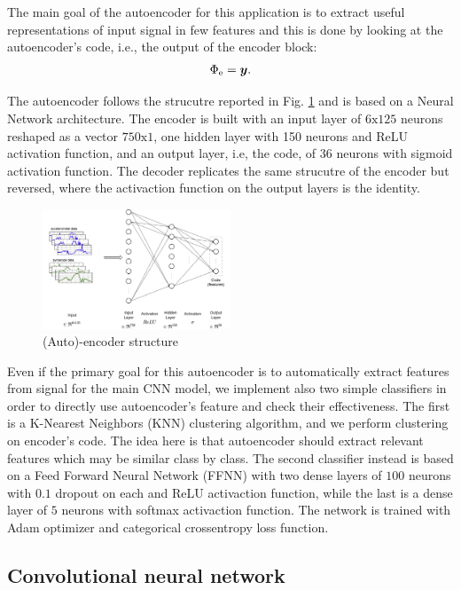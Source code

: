 The main goal of the autoencoder for this application is to extract
useful representations of input signal in few features and this is
done by looking at the autoencoder's code, i.e., the output of the
encoder block:
\begin{equation}
  \Phi_{\text{e}} = \boldsymbol{y}.
\end{equation}

The autoencoder follows the strucutre reported in
Fig. \ref{fig:encoder-structure} and is based on a Neural Network
architecture. The encoder is built with an input layer of
$6\text{x}125$ neurons reshaped as a vector $750\text{x}1$, one hidden
layer with 150 neurons and ReLU activation function, and an output
layer, i.e, the code, of $36$ neurons with sigmoid activation
function. The decoder replicates the same strucutre of the encoder but
reversed, where the activaction function on the output layers is the
identity.
\begin{figure}[h]
  \includegraphics[width=0.5\textwidth]{images/encoder.jpg}
  \caption{(Auto)-encoder structure}
  \label{fig:encoder-structure}
\end{figure}

Even if the primary goal for this autoencoder is to automatically
extract features from signal for the main CNN model, we implement also
two simple classifiers in order to directly use autoencoder's feature
and check their effectiveness.  The first is a K-Nearest Neighbors
(KNN) clustering algorithm, and we perform clustering on encoder's
code. The idea here is that autoencoder should extract relevant
features which may be similar class by class.  The second classifier
instead is based on a Feed Forward Neural Network (FFNN) with two
dense layers of $100$ neurons with $0.1$ dropout on each and ReLU
activaction function, while the last is a dense layer of $5$ neurons
with softmax activaction function. The network is trained with Adam
optimizer and categorical crossentropy loss function.

\subsection{Convolutional neural network}
\label{subsec:cnn}

